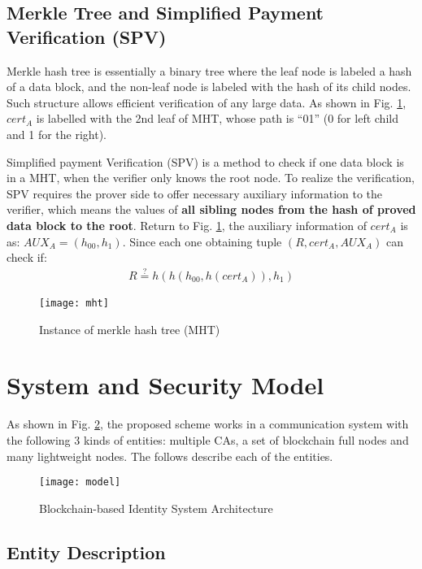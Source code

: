\documentclass[conference]{IEEEtran}
\begin{document}
\subsection{Merkle Tree and Simplified Payment Verification (SPV)}
\label{section:merkle}
Merkle hash tree \cite{merkle1987digital} is essentially a binary tree where the leaf node is labeled a hash of a data block, and the non-leaf node is labeled with the hash of its child nodes. Such structure allows efficient verification of any large data. As shown in Fig. \ref{fig:mht}, $cert_A$ is labelled with the 2nd leaf of MHT, whose path is ``01'' (0 for left child and 1 for the right).

Simplified payment Verification (SPV) is a method to check if one data block is in a MHT, when the verifier only knows the root node. To realize the verification, SPV requires the prover side to offer necessary auxiliary information to the verifier, which means the values of \textbf{all sibling nodes from the hash of proved data block to the root}.
Return to Fig. \ref{fig:mht}, the auxiliary information of $cert_A$ is as: $AUX_A = (h_{00}, h_{1})$. Since each one obtaining tuple $(R, cert_A, AUX_A)$ can check if:
\begin{align}\label{eq:aux}
R \overset{?}{=} h(h(h_{00}, h(cert_A)), h_1)
\end{align}

\begin{figure}[t]
	\centering
	\texttt{[image: mht]}
	\caption{Instance of merkle hash tree (MHT)}\label{fig:mht}
\end{figure}

\section{System and Security Model} \label{sec:model}
As shown in Fig. \ref{fig:model}, the proposed scheme works in a communication system with the following 3 kinds of entities: multiple CAs, a set of blockchain full nodes and many lightweight nodes. The follows describe each of the entities. 


\begin{figure}[t]
	\centering
	\texttt{[image: model]}
	\caption{Blockchain-based Identity System Architecture}\label{fig:model}
\end{figure}
\subsection{Entity Description}
\end{document}
